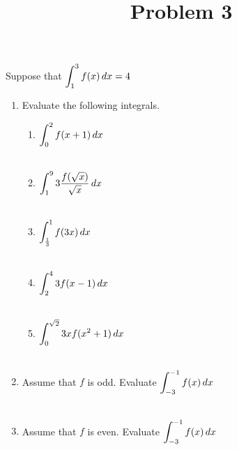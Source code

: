 \documentclass{ximera}
\title[Problem 3]{Problem 3}
\begin{document}
\begin{abstract} \end{abstract}
\maketitle

\begin{problem}
Suppose that 
\(
\displaystyle \int_{1}^{3} f(x)\,d x=4
\)
\begin{enumerate}
\item Evaluate the following integrals.
	\begin{enumerate}
	\item $\displaystyle \int_{0}^{2} f(x+1)\,d x$\\ \\
\item $\displaystyle \int_{1}^{9} 3\dfrac{f(\sqrt{x})}{\sqrt{x}}\,d x$\\ \\
\item  $\displaystyle \int_{\frac{1}{3}}^{1} f(3x)\,d x$\\ \\
\item $\displaystyle \int_{2}^{4} 3f(x-1)\,d x$\\ \\
\item $\displaystyle \int_{0}^{\sqrt{2}} 3x f(x^2+1)\,d x$\\ \\
\end{enumerate}
\item Assume that $f$ is odd. Evaluate   $\displaystyle \int_{-3}^{-1} f(x)\,d x$\\ \\
\item Assume that $f$ is even. Evaluate   $\displaystyle \int_{-3}^{-1} f(x)\,d x$\\ \\
\end{enumerate}
\end{problem}
\end{document}
